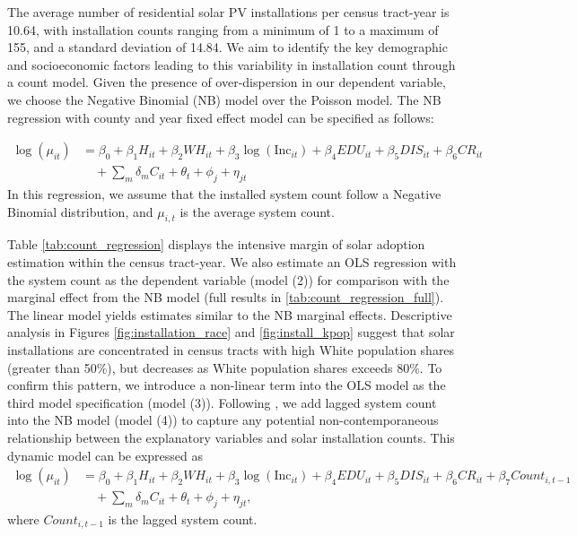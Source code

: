 \documentclass[11pt,twoside,letterpaper]{article}
\begin{document}
The average number of residential solar PV installations per census tract-year is 10.64, with installation counts ranging from a minimum of 1 to a maximum of 155, and a standard deviation of 14.84. We aim to identify the key demographic and socioeconomic factors leading to this variability in installation count through a count model. Given the presence of over-dispersion in our dependent variable, we choose the Negative Binomial (NB) model over the Poisson model. The NB regression with county and year fixed effect model can be specified as follows:

\begin{equation}
\label{reg_2}
\begin{aligned}
\log(\mu_{it}) &= \beta_{0} + \beta_{1}H_{it} + \beta_{2}WH_{it} + \beta_{3}\log(\text{Inc}_{it}) + \beta_{4}EDU_{it} + \beta_{5}DIS_{it} + \beta_{6}CR_{it} \\
&\quad + \sum_{m}\delta_{m}C_{it} + \theta_{t} + \phi_{j} + \eta_{jt}
\end{aligned}
\end{equation}
In this regression, we assume that the installed system count follow a Negative Binomial distribution, and $\mu_{i,t}$ is the average system count.


Table \ref{tab:count_regression} displays the intensive margin of solar adoption estimation within the census tract-year. We also estimate an OLS regression with the system count as the dependent variable (model (2)) for comparison with the marginal effect from the NB model (full results in \autoref{tab:count_regression_full}). The linear model yields estimates similar to the NB marginal effects. Descriptive analysis in Figures \ref{fig:installation_race} and \ref{fig:install_kpop} suggest that solar installations are concentrated in census tracts with high White population shares (greater than 50\%), but decreases as White population shares exceeds 80\%. To confirm this pattern, we introduce a non-linear term into the OLS model as the third model specification (model (3)). Following \textcite{ros_residential_2023}, we add lagged system count into the NB model (model (4)) to capture any potential non-contemporaneous relationship between the explanatory variables and solar installation counts. This dynamic model can be expressed as 
\begin{equation}
\label{reg_2.2}
\begin{aligned}
\log(\mu_{it}) &= \beta_{0} + \beta_{1}H_{it} + \beta_{2}WH_{it} + \beta_{3}\log(\text{Inc}_{it}) + \beta_{4}EDU_{it} + \beta_{5}DIS_{it} + \beta_{6}CR_{it} + \beta_7Count_{i,t-1}\\
&\quad + \sum_{m}\delta_{m}C_{it} + \theta_{t} + \phi_{j} + \eta_{jt},
\end{aligned}
\end{equation}
where $Count_{i,t-1}$ is the lagged system count.
\end{document}
